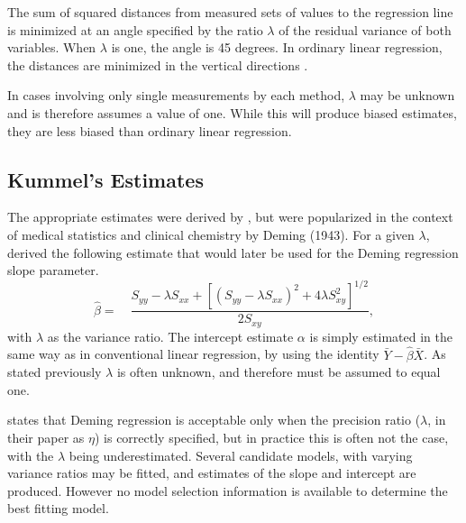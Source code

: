 \documentclass[12pt, a4paper]{report}
\theoremstyle{plain}
\theoremstyle{definition}
\theoremstyle{remark}
\begin{document}
The sum of squared distances from measured sets of values to the regression line is minimized at an angle specified by the ratio $\lambda$ of the residual variance of both variables. When $\lambda$ is one, the angle is 45 degrees. In ordinary linear regression, the distances are minimized in the vertical directions \citep{linnet99}.

In cases involving only single measurements by each method, $\lambda$ may be unknown and is therefore assumes a value of one. While this will produce biased estimates, they are less biased than ordinary linear regression.
	
	
\subsection{Kummel's Estimates}

The appropriate estimates were derived by \citet{Kummel}, but were popularized in the context of medical statistics and clinical chemistry by Deming (1943).
For a given $\lambda$, \citet{Kummel} derived the following estimate that would later be used for the Deming regression slope
parameter. 
\begin{equation}
\hat{\beta} =\quad \frac{S_{yy} - \lambda S_{xx}+[(S_{yy} -
	\lambda S_{xx})^{2}+ 4\lambda S^{2}_{xy}]^{1/2}}{2S_{xy}},
\end{equation}
with $\lambda$ as the variance ratio. The intercept estimate $\alpha$ is simply estimated in the same way as in conventional linear
regression, by using the identity $\bar{Y}-\hat{\beta}\bar{X}$. As stated previously $\lambda$ is often unknown, and therefore must be assumed to equal one. 

\citet{CarollRupert} states that Deming
regression is acceptable only when the precision ratio ($\lambda$, in their paper as $\eta$) is correctly specified, but in practice this is often not the case, with the $\lambda$ being underestimated. Several candidate models, with varying variance ratios may be fitted, and estimates of the slope and intercept are produced. However no model selection information is available to determine the best fitting model.
\end{document}
